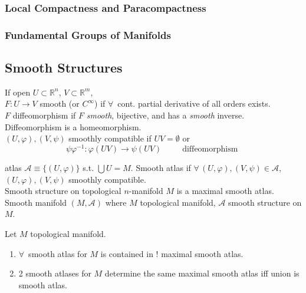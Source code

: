 \subsubsection*{Local Compactness and Paracompactness}



\subsubsection*{Fundamental Groups of Manifolds}





\subsection*{Smooth Structures}

If open $U \subset \mathbb{R}^n$, $V \subset \mathbb{R}^m$, \\
$F:U \to V$ smooth (or $C^{\infty}$) if $\forall \, $ cont. partial derivative of all orders exists.  \\

$F$ diffeomorphism if $F$ \emph{smooth}, bijective, and has a \emph{smooth} inverse.  \\
Diffeomorphism is a homeomorphism.  \\

$(U, \varphi), (V,\psi)$ smoothly compatible if $UV = \emptyset$ or 
\[
\psi \varphi^{-1}: \varphi(UV) \to \psi(UV) \quad \quad \, \text{ diffeomorphism }
\]

atlas $\mathcal{A} \equiv \lbrace (U, \varphi ) \rbrace$ s.t. $\bigcup U = M$.  Smooth atlas if $\forall \, (U,\varphi), (V, \psi) \in \mathcal{A}$, $(U,\varphi), (V,\psi)$ smoothly compatible.  \\

Smooth structure on topological $n$-manifold $M$ is a maximal smooth atlas.   \\

Smooth manifold $(M, \mathcal{A})$ where $M$ topological manifold, $\mathcal{A}$ smooth structure on $M$.   \\


\begin{proposition}[1.17] Let $M$ topological manifold. 
\begin{enumerate}
\item[(a)] $\forall \, $ smooth atlas for $M$ is contained in ! maximal smooth atlas.  
\item[(b)] 2 smooth atlases for $M$ determine the same maximal smooth atlas iff union is smooth atlas.  
\end{enumerate}
\end{proposition}

